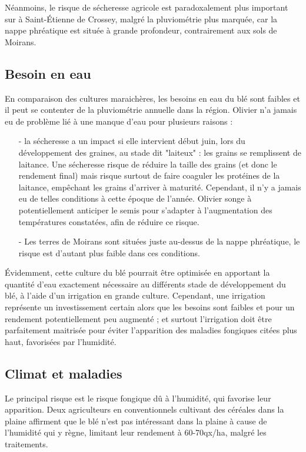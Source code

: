 \documentclass{article}
\begin{document}
Néanmoins, le risque de sécheresse agricole est paradoxalement plus important sur à Saint-Étienne de Crossey, malgré la pluviométrie plus marquée, car la nappe phréatique est située à grande profondeur, contrairement aux sols de Moirans.

\subsection{Besoin en eau}

En comparaison des cultures maraichères, les besoins en eau du blé sont faibles et il peut se contenter de la pluviométrie annuelle dans la région. Olivier n'a jamais eu de problème lié à une manque d'eau pour plusieurs raisons :
\begin{itemize}
	\item[-] la sécheresse a un impact si elle intervient début juin, lors du développement des graines, au stade dit "laiteux" : les grains se remplissent de laitance. Une sécheresse risque de réduire la taille des grains (et donc le rendement final) mais risque surtout de faire coaguler les protéines de la laitance, empêchant les grains d'arriver à maturité. Cependant, il n'y a jamais eu de telles conditions à cette époque de l'année. Olivier songe à potentiellement anticiper le semis pour s'adapter à l'augmentation des températures constatées, afin de réduire ce risque.
	\item[-] Les terres de Moirans sont situées juste au-dessus de la nappe phréatique, le risque est d'autant plus faible dans ces conditions. 
\end{itemize}
Évidemment, cette culture du blé pourrait être optimisée en apportant la quantité d'eau exactement nécessaire au différents stade de développement du blé, à l'aide d'un irrigation en grande culture. Cependant, une irrigation représente un investissement certain alors que les besoins sont faibles et pour un rendement potentiellement peu augmenté ; et surtout l'irrigation doit être parfaitement maitrisée pour éviter l'apparition des maladies fongiques citées plus haut, favorisées par l'humidité. 

\subsection{Climat et maladies}

Le principal risque est le risque fongique dû à l'humidité, qui favorise leur apparition. Deux agriculteurs en conventionnels cultivant des céréales dans la plaine affirment que le blé n'est pas intéressant dans la plaine à cause de l'humidité qui y règne, limitant leur rendement à 60-70qx/ha, malgré les traitements. 
\end{document}
